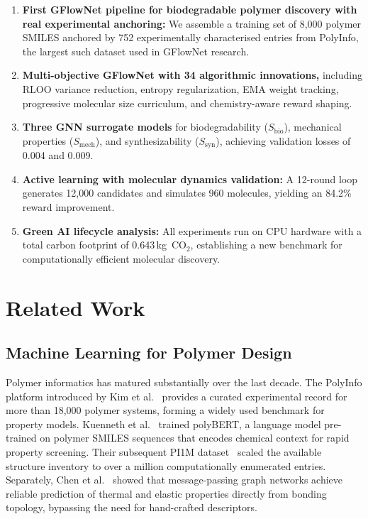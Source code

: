 \documentclass[twocolumn,10pt]{article}
\begin{document}
\begin{enumerate}[noitemsep]
  \item \textbf{First GFlowNet pipeline for biodegradable polymer discovery with real experimental anchoring:} We assemble a training set of 8,000 polymer SMILES anchored by 752 experimentally characterised entries from PolyInfo, the largest such dataset used in GFlowNet research.
  \item \textbf{Multi-objective GFlowNet with 34 algorithmic innovations,} including RLOO variance reduction, entropy regularization, EMA weight tracking, progressive molecular size curriculum, and chemistry-aware reward shaping.
  \item \textbf{Three GNN surrogate models} for biodegradability ($S_\text{bio}$), mechanical properties ($S_\text{mech}$), and synthesizability ($S_\text{syn}$), achieving validation losses of 0.004 and 0.009.
  \item \textbf{Active learning with molecular dynamics validation:} A 12-round loop generates 12,000 candidates and simulates 960 molecules, yielding an 84.2\% reward improvement.
  \item \textbf{Green AI lifecycle analysis:} All experiments run on CPU hardware with a total carbon footprint of 0.643\,kg~CO$_2$, establishing a new benchmark for computationally efficient molecular discovery.
\end{enumerate}

\section{Related Work}

\subsection{Machine Learning for Polymer Design}
Polymer informatics has matured substantially over the last decade. The PolyInfo platform
introduced by Kim et al.~\cite{kim2018polymer} provides a curated experimental record for
more than 18,000 polymer systems, forming a widely used benchmark for property models.
Kuenneth et al.~\cite{kuenneth2023polybert} trained polyBERT, a language model pre-trained on
polymer SMILES sequences that encodes chemical context for rapid property screening.
Their subsequent PI1M dataset~\cite{kuenneth2023pi1m} scaled the available structure inventory
to over a million computationally enumerated entries. Separately, Chen et al.~\cite{chen2021polymer}
showed that message-passing graph networks achieve reliable prediction of thermal and elastic
properties directly from bonding topology, bypassing the need for hand-crafted descriptors.
\end{document}
